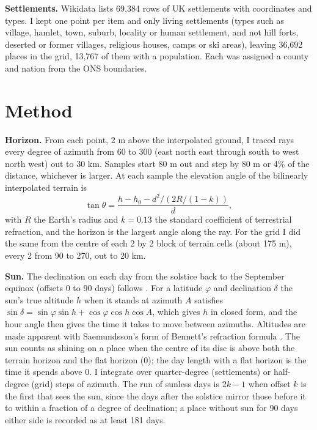 \documentclass[11pt,a4paper]{article}
\begin{document}
\textbf{Settlements.} Wikidata \citep{wikidata} lists 69,384 rows of UK settlements with coordinates and types. I kept one point per item and only living settlements (types such as village, hamlet, town, suburb, locality or human settlement, and not hill forts, deserted or former villages, religious houses, camps or ski areas), leaving 36,692 places in the grid, 13,767 of them with a population. Each was assigned a county and nation from the ONS boundaries.

\section{Method}
\textbf{Horizon.} From each point, 2 m above the interpolated ground, I traced rays every degree of azimuth from 60\textdegree{} to 300\textdegree{} (east north east through south to west north west) out to 30 km. Samples start 80 m out and step by 80 m or 4\% of the distance, whichever is larger. At each sample the elevation angle of the bilinearly interpolated terrain is
\[ \tan\theta = \frac{h - h_0 - d^2 / (2R/(1-k))}{d}, \]
with $R$ the Earth's radius and $k = 0.13$ the standard coefficient of terrestrial refraction, and the horizon is the largest angle along the ray. For the grid I did the same from the centre of each 2 by 2 block of terrain cells (about 175 m), every 2\textdegree{} from 90\textdegree{} to 270\textdegree{}, out to 20 km.

\textbf{Sun.} The declination on each day from the solstice back to the September equinox (offsets 0 to 90 days) follows \citet{cooper1969}. For a latitude $\varphi$ and declination $\delta$ the sun's true altitude $h$ when it stands at azimuth $A$ satisfies $\sin\delta = \sin\varphi\sin h + \cos\varphi\cos h\cos A$, which gives $h$ in closed form, and the hour angle then gives the time it takes to move between azimuths. Altitudes are made apparent with Saemundsson's form of Bennett's refraction formula \citep{bennett1982,saemundsson1986}. The sun counts as shining on a place when the centre of its disc is above both the terrain horizon and the flat horizon (0\textdegree{}); the day length with a flat horizon is the time it spends above 0\textdegree{}. I integrate over quarter-degree (settlements) or half-degree (grid) steps of azimuth. The run of sunless days is $2k-1$ when offset $k$ is the first that sees the sun, since the days after the solstice mirror those before it to within a fraction of a degree of declination; a place without sun for 90 days either side is recorded as at least 181 days.
\end{document}
